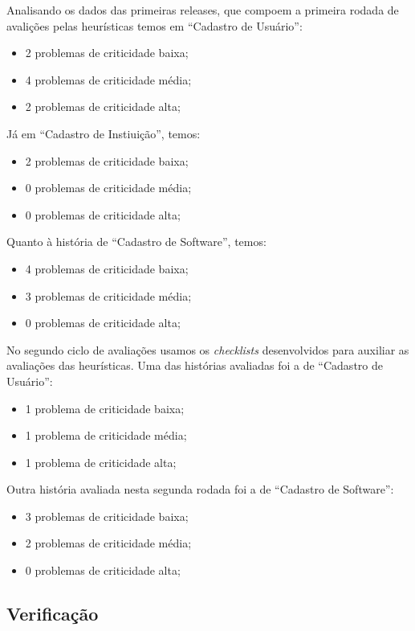 Analisando os dados das primeiras releases, que compoem a primeira rodada de avalições pelas heurísticas temos em ``Cadastro de Usuário'':
\begin{itemize}
	\item 2 problemas de criticidade baixa;
	\item 4 problemas de criticidade média;
	\item 2 problemas de criticidade alta;
\end{itemize}

Já em ``Cadastro de Instiuição'', temos:
\begin{itemize}
	\item 2 problemas de criticidade baixa;
	\item 0 problemas de criticidade média;
	\item 0 problemas de criticidade alta;
\end{itemize}

Quanto à história de ``Cadastro de  Software'', temos:
\begin{itemize}
	\item 4 problemas de criticidade baixa;
	\item 3 problemas de criticidade média;
	\item 0 problemas de criticidade alta;
\end{itemize}

No segundo ciclo de avaliações usamos os \textit{checklists} desenvolvidos para auxiliar as avaliações das heurísticas. Uma das histórias avaliadas foi a de ``Cadastro de Usuário'':

\begin{itemize}
	\item 1 problema de criticidade baixa;
	\item 1 problema de criticidade média;
	\item 1 problema de criticidade alta;
\end{itemize} 

Outra história avaliada nesta segunda rodada foi a de ``Cadastro de Software'':

\begin{itemize}
	\item 3 problemas de criticidade baixa;
	\item 2 problemas de criticidade média;
	\item 0 problemas de criticidade alta;
\end{itemize} 

\subsection{Verificação}

